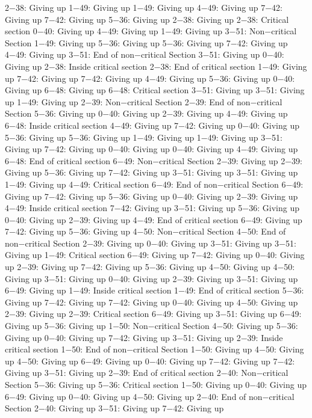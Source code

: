 2−38: Giving up
1−49: Giving up
1−49: Giving up
4−49: Giving up
7−42: Giving up
7−42: Giving up
5−36: Giving up
2−38: Giving up
2−38: Critical section
0−40: Giving up
4−49: Giving up
1−49: Giving up
3−51: Non−critical Section
1−49: Giving up
5−36: Giving up
5−36: Giving up
7−42: Giving up
4−49: Giving up
3−51: End of non−critical Section
3−51: Giving up
0−40: Giving up
2−38: Inside critical section
2−38: End of critical section
1−49: Giving up
7−42: Giving up
7−42: Giving up
4−49: Giving up
5−36: Giving up
0−40: Giving up
6−48: Giving up
6−48: Critical section
3−51: Giving up
3−51: Giving up
1−49: Giving up
2−39: Non−critical Section
2−39: End of non−critical Section
5−36: Giving up
0−40: Giving up
2−39: Giving up
4−49: Giving up
6−48: Inside critical section
4−49: Giving up
7−42: Giving up
0−40: Giving up
5−36: Giving up
5−36: Giving up
1−49: Giving up
1−49: Giving up
3−51: Giving up
7−42: Giving up
0−40: Giving up
0−40: Giving up
4−49: Giving up
6−48: End of critical section
6−49: Non−critical Section
2−39: Giving up
2−39: Giving up
5−36: Giving up
7−42: Giving up
3−51: Giving up
3−51: Giving up
1−49: Giving up
4−49: Critical section
6−49: End of non−critical Section
6−49: Giving up
7−42: Giving up
5−36: Giving up
0−40: Giving up
2−39: Giving up
4−49: Inside critical section
7−42: Giving up
3−51: Giving up
5−36: Giving up
0−40: Giving up
2−39: Giving up
4−49: End of critical section
6−49: Giving up
7−42: Giving up
5−36: Giving up
4−50: Non−critical Section
4−50: End of non−critical Section
2−39: Giving up
0−40: Giving up
3−51: Giving up
3−51: Giving up
1−49: Critical section
6−49: Giving up
7−42: Giving up
0−40: Giving up
2−39: Giving up
7−42: Giving up
5−36: Giving up
4−50: Giving up
4−50: Giving up
3−51: Giving up
0−40: Giving up
2−39: Giving up
3−51: Giving up
6−49: Giving up
1−49: Inside critical section
1−49: End of critical section
5−36: Giving up
7−42: Giving up
7−42: Giving up
0−40: Giving up
4−50: Giving up
2−39: Giving up
2−39: Critical section
6−49: Giving up
3−51: Giving up
6−49: Giving up
5−36: Giving up
1−50: Non−critical Section
4−50: Giving up
5−36: Giving up
0−40: Giving up
7−42: Giving up
3−51: Giving up
2−39: Inside critical section
1−50: End of non−critical Section
1−50: Giving up
4−50: Giving up
4−50: Giving up
6−49: Giving up
0−40: Giving up
7−42: Giving up
7−42: Giving up
3−51: Giving up
2−39: End of critical section
2−40: Non−critical Section
5−36: Giving up
5−36: Critical section
1−50: Giving up
0−40: Giving up
6−49: Giving up
0−40: Giving up
4−50: Giving up
2−40: End of non−critical Section
2−40: Giving up
3−51: Giving up
7−42: Giving up
